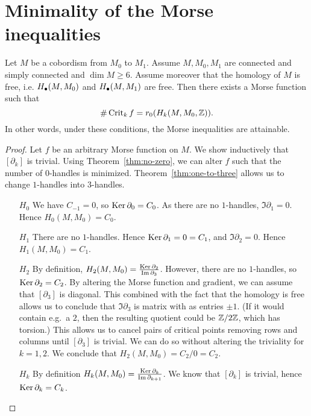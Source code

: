 \section{Minimality of the Morse inequalities}
\begin{theorem}
    Let $M$ be a cobordism from $M_0$ to $M_1$.
    Assume $M, M_0, M_1$ are connected and simply connected and $\dim M \ge 6$.
    Assume moreover that the homology of $M$ is free, i.e.  $H_{\bullet}(M, M_0)$ and $H_{\bullet}(M, M_1)$ are free.
    Then there exists a Morse function such that
    \[
        \# \operatorname{Crit}_k f = r_0(H_k(M, M_0, \mathbb{Z}))
    .\] 
    In other words, under these conditions, the Morse inequalities are attainable.
\end{theorem}
\begin{proof}
    Let $f$ be an arbitrary Morse function on $M$.
    We show inductively that $[\partial_k]$ is trivial.
    Using Theorem~\ref{thm:no-zero}, we can alter $f$ such that the number of $0$-handles is minimized.
    Theorem~\ref{thm:one-to-three} allows us to change $1$-handles into $3$-handles.
    \begin{enumerate}
        \item[$H_0$]
            We have $C_{-1} = 0$, so $\operatorname{Ker} \partial_0 = C_0$.
            As there are no $1$-handles, $\Im \partial_1 = 0$.
            Hence  $H_0(M, M_0) = C_0$.
        \item[$H_1$]
            There are no $1$-handles.
            Hence $\operatorname{Ker} \partial_1 = 0 = C_1$, and $\Im \partial_2 = 0$. Hence  $H_1(M, M_0) = C_1$.
        \item[$ H_2$]
            By definition, $H_2(M, M_0) = \frac{\operatorname{Ker} \partial_2}{\operatorname{Im} \partial_3}$.
            However, there are no $1$-handles,
            so $\operatorname{Ker} \partial_2 = C_2$.
            By altering the Morse function and gradient, we can assume that $[\partial_3]$ is diagonal.
            This combined with the fact that the homology is free allows us to conclude that $\Im \partial_3$ is matrix with as entries $\pm 1$.
            (If it would contain e.g.\ a $2$, then the resulting quotient could be  $\mathbb{Z} / 2 \mathbb{Z}$, which has torsion.)
            This allows us to cancel pairs of critical points removing rows and columns until $[\partial_3]$ is trivial.
            We can do so without altering the triviality for $k = 1,2$.
            We conclude that $H_2(M, M_0) = C_2 / 0 = C_2$.
        \item [$H_k$]
            By definition $H_k(M, M_0) = \frac{\operatorname{Ker} \partial_k}{\operatorname{Im} \partial_{k+1}}$.
            We know that $[\partial_k]$ is trivial, hence  $\operatorname{Ker} \partial_k = C_k$.

\end{enumerate}
\end{proof}
